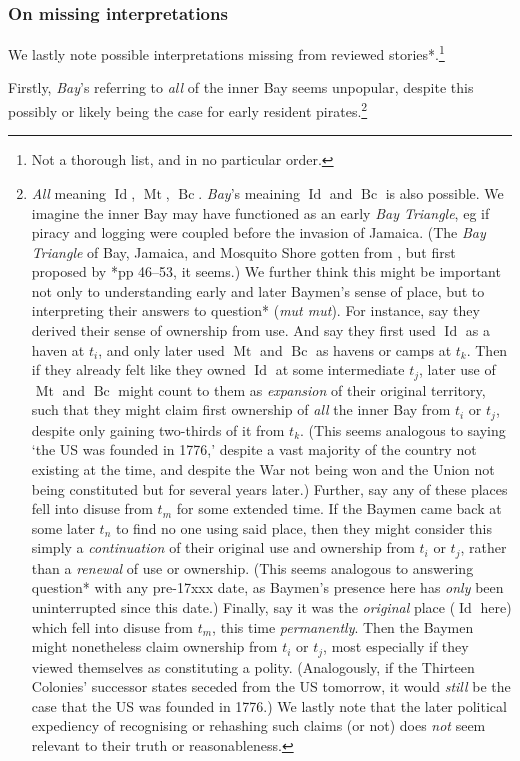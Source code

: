 \documentclass{amsart}
\newcommand{\ment}{\textit} %
\newcommand{\forn}{\textit} %
\DeclareMathOperator{\id}{Id} %
\DeclareMathOperator{\mt}{Mt} %
\DeclareMathOperator{\bc}{Bc} %
\theoremstyle{definition}
\theoremstyle{remark}
\begin{document}
		\subsubsection{On missing interpretations}
		\label{sss:onmissinginterpret}
		We lastly note possible interpretations missing from reviewed stories*.\footnote{Not a thorough list, and in no particular order.} 
		
		Firstly, \ment{Bay}'s referring to \emph{all} of the inner Bay seems unpopular, despite this possibly or likely being the case for early resident pirates.\footnote{\ment{All} meaning \(\id\), \(\mt\), \(\bc\). \ment{Bay}'s meaining \(\id\) and \(\bc\) is also possible. We imagine the inner Bay may have functioned as an early \ment{Bay Triangle}, eg if piracy and logging were coupled before the invasion of Jamaica. (The \ment{Bay Triangle} of Bay, Jamaica, and Mosquito Shore gotten from , but first proposed by \cite{nay89}*{pp 46--53}, it seems.) We further think this might be important not only to understanding early and later Baymen's sense of place, but to interpreting their answers to question* (\forn{mut mut}). For instance, say they derived their sense of ownership from use. And say they first used \(\id\) as a haven at \(t_i\), and only later used \(\mt\) and \(\bc\) as havens or camps at \(t_k\). Then if they already felt like they owned \(\id\) at some intermediate \(t_j\), later use of \(\mt\) and \(\bc\) might count to them as \emph{expansion} of their original territory, such that they might claim first ownership of \emph{all} the inner Bay from \(t_i\) or \(t_j\), despite only gaining two-thirds of it from \(t_k\). (This seems analogous to saying `the US was founded in 1776,' despite a vast majority of the country not existing at the time, and despite the War not being won and the Union not being constituted but for several years later.) Further, say any of these places fell into disuse from \(t_m\) for some extended time. If the Baymen came back at some later \(t_n\) to find no one using said place, then they might consider this simply a \emph{continuation} of their original use and ownership from \(t_i\) or \(t_j\), rather than a \emph{renewal} of use or ownership. (This seems analogous to answering question* with any pre-17xxx date, as Baymen's presence here has \emph{only} been uninterrupted since this date.) Finally, say it was the \emph{original} place (\(\id\) here) which fell into disuse from \(t_m\), this time \emph{permanently}. Then the Baymen might nonetheless claim ownership from \(t_i\) or \(t_j\), most especially if they viewed themselves as constituting a polity. (Analogously, if the Thirteen Colonies' successor states seceded from the US tomorrow, it would \emph{still} be the case that the US was founded in 1776.) We lastly note that the later political expediency of recognising or rehashing such claims (or not) does \emph{not} seem relevant to their truth or reasonableness.}
		
\end{document}
